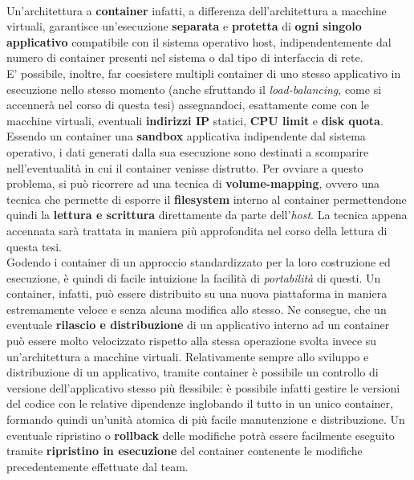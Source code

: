 \\Un'architettura a \textbf{container} infatti, a differenza dell'architettura a macchine virtuali, garantisce un'esecuzione \textbf{separata} e \textbf{protetta} di \textbf{ogni singolo applicativo} compatibile con il sistema operativo host, indipendentemente dal numero di container presenti nel sistema o dal tipo di interfaccia di rete. \\
E' possibile, inoltre, far coesistere multipli container di uno stesso applicativo in esecuzione nello stesso momento (anche sfruttando il \textit{\gls{load-balancing}}, come si accennerà nel corso di questa tesi) assegnandoci, esattamente come con le macchine virtuali, eventuali \textbf{indirizzi IP} statici, \textbf{CPU limit} e \textbf{disk quota}.\\
Essendo un container una \textbf{\gls{sandbox}} applicativa indipendente dal sistema operativo, i dati generati dalla sua esecuzione sono destinati a scomparire nell'eventualità in cui il container venisse distrutto. Per ovviare a questo problema, si può ricorrere ad una tecnica di \textbf{volume-mapping}, ovvero una tecnica che permette di esporre il \textbf{\gls{filesystem}} interno al container permettendone quindi la \textbf{lettura e scrittura} direttamente da parte dell'\textit{host}. La tecnica appena accennata sarà trattata in maniera più approfondita nel corso della lettura di questa tesi.\\
Godendo i container di un approccio standardizzato per la loro costruzione ed esecuzione, è quindi di facile intuizione la facilità di \textit{portabilità} di questi. Un container, infatti, può essere distribuito su una nuova piattaforma in maniera estremamente veloce e senza alcuna modifica allo stesso. Ne consegue, che un eventuale \textbf{rilascio e distribuzione} di un applicativo interno ad un container può essere molto velocizzato rispetto alla stessa operazione svolta invece su un'architettura a macchine virtuali. Relativamente sempre allo sviluppo e distribuzione di un applicativo, tramite container è possibile un controllo di versione dell'applicativo stesso più flessibile: è possibile infatti gestire le versioni del codice con le relative dipendenze inglobando il tutto in un unico container, formando quindi un'unità atomica di più facile manutenzione e distribuzione. Un eventuale ripristino o \textbf{\gls{rollback}} delle modifiche potrà essere facilmente eseguito tramite \textbf{ripristino in esecuzione} del container contenente le modifiche precedentemente effettuate dal team.\\
